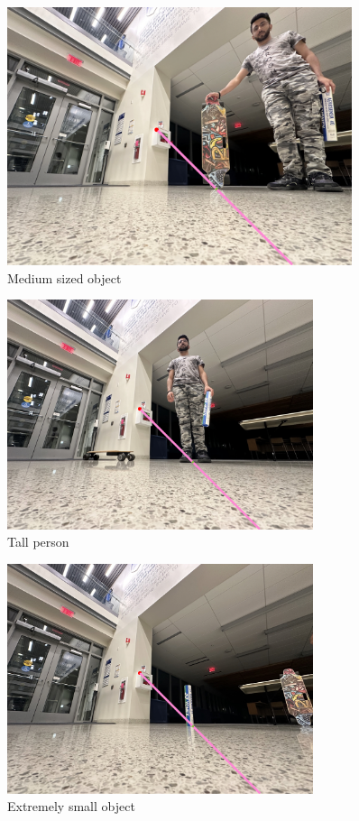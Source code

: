\begin{figure}[H]
    \centering
    \includegraphics[width=0.9\textwidth]{3vpmo.jpeg}
    \caption{Medium sized object}
    \label{fig: Medium sized object}
\end{figure}

\begin{figure}[H]
    \centering
    \includegraphics[width=0.8\textwidth]{3vpto.jpeg}
    \caption{Tall person}
    \label{fig: Tall person}
\end{figure}

\begin{figure}[H]
    \centering
    \includegraphics[width=0.8\textwidth]{3vpso.jpeg}
    \caption{Extremely small object}
    \label{fig: Extremely small object}
\end{figure}

